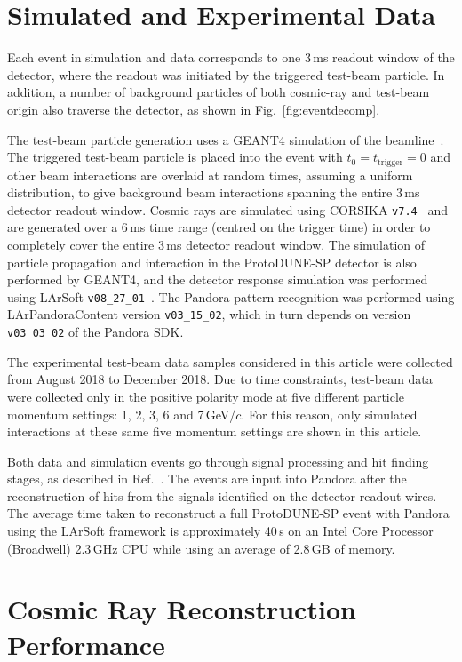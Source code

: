 \documentclass[epjc3]{svjour3}
\begin{document}
\section{Simulated and Experimental Data}
\label{sec:datadescription}
Each event in simulation and data corresponds to one 3\,ms readout window of the detector, where the readout was initiated by the triggered test-beam particle. In addition, a number of background particles of both cosmic-ray and test-beam origin also traverse the detector, as shown in Fig.~\ref{fig:eventdecomp}.

The test-beam particle generation uses a GEANT4 simulation of the beamline~\cite{PhysRevAccelBeams.20.111001,PhysRevAccelBeams.22.061003}. The triggered test-beam particle is placed into the event with $t_0=t_\textrm{trigger}=0$ and other beam interactions are overlaid at random times, assuming a uniform distribution, to give background beam interactions spanning the entire 3\,ms detector readout window. Cosmic rays are simulated using CORSIKA \texttt{v7.4}~\cite{corsika} and are generated over a 6\,ms time range (centred on the trigger time) in order to completely cover the entire 3\,ms detector readout window. The simulation of particle propagation and interaction in the ProtoDUNE-SP detector is also performed by GEANT4, and the detector response simulation was performed using LArSoft \texttt{v08\_27\_01}~\cite{Church:2013hea}. The Pandora pattern recognition was performed using LArPandoraContent version \texttt{v03\_15\_02}, which in turn depends on version \texttt{v03\_03\_02} of the Pandora SDK.

The experimental test-beam data samples considered in this article were collected from August 2018 to December 2018. Due to time constraints, test-beam data were collected only in the positive polarity mode at five different particle momentum settings: 1, 2, 3, 6 and 7\,GeV/$c$. For this reason, only simulated interactions at these same five momentum settings are shown in this article.

Both data and simulation events go through signal processing and hit finding stages, as described in Ref.~\cite{proto_performance}. The events are input into Pandora after the reconstruction of hits from the signals identified on the detector readout wires. The average time taken to reconstruct a full ProtoDUNE-SP event with Pandora using the LArSoft framework is approximately 40\,s on an Intel Core Processor (Broadwell) 2.3\,GHz CPU while using an average of 2.8\,GB of memory.

\section{Cosmic Ray Reconstruction Performance}
\label{sec:cosmicrecoperformance}
\end{document}
